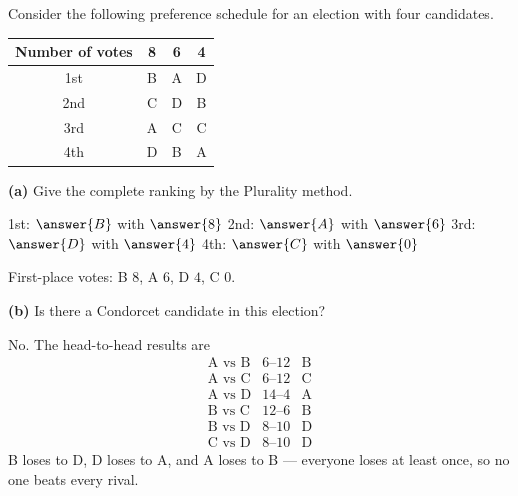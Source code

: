 \documentclass[12pt]{ximera}
\begin{document}
\begin{problem}
Consider the following preference schedule for an election with four candidates.

\begin{center}
\begin{tabular}{c|ccc}
Number of votes & 8 & 6 & 4 \\\hline
1st & B & A & D \\
2nd & C & D & B \\
3rd & A & C & C \\
4th & D & B & A
\end{tabular}
\end{center}

\begin{prompt}
\textbf{(a)} Give the complete ranking by the Plurality method.

1st: $\answer{B}$ with $\answer{8}$ \quad 2nd: $\answer{A}$ with $\answer{6}$ \quad
3rd: $\answer{D}$ with $\answer{4}$ \quad 4th: $\answer{C}$ with $\answer{0}$

\begin{feedback}
First-place votes: B $8$, A $6$, D $4$, C $0$.
\end{feedback}
\end{prompt}

\begin{prompt}
\textbf{(b)} Is there a Condorcet candidate in this election?

\begin{multipleChoice}
\end{multipleChoice}

\begin{feedback}
No. The head-to-head results are
\[
\begin{array}{lll}
\text{A vs B} & 6\text{--}12 & \text{B}\\
\text{A vs C} & 6\text{--}12 & \text{C}\\
\text{A vs D} & 14\text{--}4 & \text{A}\\
\text{B vs C} & 12\text{--}6 & \text{B}\\
\text{B vs D} & 8\text{--}10 & \text{D}\\
\text{C vs D} & 8\text{--}10 & \text{D}
\end{array}
\]
B loses to D, D loses to A, and A loses to B --- everyone loses at least once, so no one
beats every rival.
\end{feedback}
\end{prompt}
\end{problem}
\end{document}
